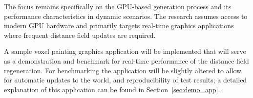 The focus remains specifically on the GPU-based generation process and its performance characteristics in dynamic
scenarios. The research assumes access to modern GPU hardware and primarily targets real-time graphics applications
where frequent distance field updates are required.

A sample voxel painting graphics application will be implemented that will serve as a demonstration and benchmark for
real-time performance of the distance field regeneration. For benchmarking the application will be slightly altered to
allow for automatic updates to the world, and reproducibility of test results; a detailed explanation of this
application can be found in Section~\ref{sec:demo_app}.
